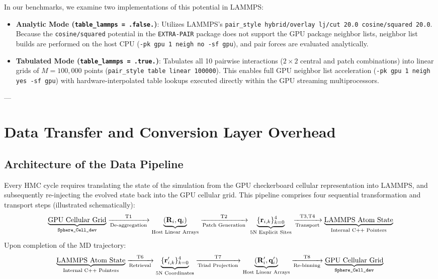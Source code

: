 \documentclass[11pt,a4paper]{article}
\begin{document}
In our benchmarks, we examine two implementations of this potential in LAMMPS:
\begin{itemize}
    \item \textbf{Analytic Mode (\texttt{table\_lammps = .false.})}: Utilizes LAMMPS's \texttt{pair\_style hybrid/overlay lj/cut 20.0 cosine/squared 20.0}. Because the \texttt{cosine/squared} potential in the \texttt{EXTRA-PAIR} package does not support the GPU package neighbor lists, neighbor list builds are performed on the host CPU (\texttt{-pk gpu 1 neigh no -sf gpu}), and pair forces are evaluated analytically.
    \item \textbf{Tabulated Mode (\texttt{table\_lammps = .true.})}: Tabulates all 10 pairwise interactions ($2 \times 2$ central and patch combinations) into linear grids of $M = 100{,}000$ points (\texttt{pair\_style table linear 100000}). This enables full GPU neighbor list acceleration (\texttt{-pk gpu 1 neigh yes -sf gpu}) with hardware-interpolated table lookups executed directly within the GPU streaming multiprocessors.
\end{itemize}

---

\section{Data Transfer and Conversion Layer Overhead}

\subsection{Architecture of the Data Pipeline}

Every HMC cycle requires translating the state of the simulation from the GPU checkerboard cellular representation into LAMMPS, and subsequently re-injecting the evolved state back into the GPU cellular grid. This pipeline comprises four sequential transformation and transport steps (illustrated schematically):
\begin{equation}
\underbrace{\text{GPU Cellular Grid}}_{\text{\texttt{Sphere\_Cell\_dev}}} 
\xrightarrow[\text{De-aggregation}]{\mathrm{T1}}
\underbrace{(\mathbf{R}_i, \mathbf{q}_i)}_{\text{Host Linear Arrays}}
\xrightarrow[\text{Patch Generation}]{\mathrm{T2}}
\underbrace{\{\mathbf{r}_{i,k}\}_{k=0}^{4}}_{\text{5N Explicit Sites}}
\xrightarrow[\text{Transport}]{\mathrm{T3, T4}}
\underbrace{\text{LAMMPS Atom State}}_{\text{Internal C++ Pointers}}
\end{equation}
Upon completion of the MD trajectory:
\begin{equation}
\underbrace{\text{LAMMPS Atom State}}_{\text{Internal C++ Pointers}}
\xrightarrow[\text{Retrieval}]{\mathrm{T6}}
\underbrace{\{\mathbf{r}'_{i,k}\}_{k=0}^{4}}_{\text{5N Coordinates}}
\xrightarrow[\text{Triad Projection}]{\mathrm{T7}}
\underbrace{(\mathbf{R}'_i, \mathbf{q}'_i)}_{\text{Host Linear Arrays}}
\xrightarrow[\text{Re-binning}]{\mathrm{T8}}
\underbrace{\text{GPU Cellular Grid}}_{\text{\texttt{Sphere\_Cell\_dev}}}
\end{equation}
\end{document}
